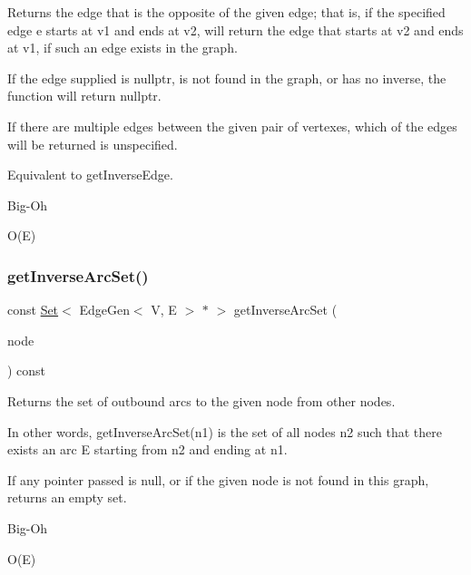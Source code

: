 Returns the edge that is the opposite of the given edge; that is, if the specified edge e starts at v1 and ends at v2, will return the edge that starts at v2 and ends at v1, if such an edge exists in the graph. 

If the edge supplied is nullptr, is not found in the graph, or has no inverse, the function will return nullptr.

If there are multiple edges between the given pair of vertexes, which of the edges will be returned is unspecified.

Equivalent to get\+Inverse\+Edge. \begin{DoxyRefDesc}{Big-\/\+Oh}
\item[\mbox{\hyperlink{BigOh__BigOh000022}{Big-\/\+Oh}}]O(\+E) \end{DoxyRefDesc}
\mbox{\label{classGraph_ad5fd149800cd46aae497b05b46059b63}} 
\subsubsection{\texorpdfstring{get\+Inverse\+Arc\+Set()}{getInverseArcSet()}\hspace{0.1cm}{\footnotesize\ttfamily [1/2]}}
{\footnotesize\ttfamily const \mbox{\hyperlink{classSet}{Set}}$<$ Edge\+Gen$<$ V, E $>$  $\ast$ $>$ get\+Inverse\+Arc\+Set (\begin{DoxyParamCaption}\item[{\mbox{\hyperlink{classVertexGen}{Vertex\+Gen}}$<$ V, E $>$  $\ast$}]{node }\end{DoxyParamCaption}) const\hspace{0.3cm}{\ttfamily [inherited]}}



Returns the set of outbound arcs to the given node from other nodes. 

In other words, get\+Inverse\+Arc\+Set(n1) is the set of all nodes n2 such that there exists an arc E starting from n2 and ending at n1.

If any pointer passed is null, or if the given node is not found in this graph, returns an empty set. \begin{DoxyRefDesc}{Big-\/\+Oh}
\item[\mbox{\hyperlink{BigOh__BigOh000065}{Big-\/\+Oh}}]O(\+E) \end{DoxyRefDesc}
\mbox{\label{classGraph_a2cfe12e71ca594736a1e329461cff024}} 
